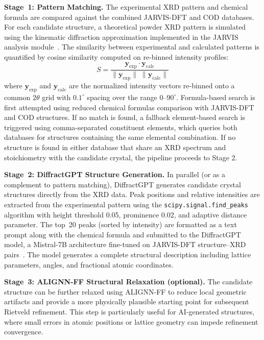 \documentclass[pdflatex,sn-mathphys-num]{sn-jnl}
\theoremstyle{thmstyleone}
\theoremstyle{thmstyletwo}
\theoremstyle{thmstylethree}
\begin{document}
\textbf{Stage~1: Pattern Matching.}
The experimental XRD pattern and chemical formula are compared against the combined JARVIS-DFT and COD databases. For each candidate structure, a theoretical powder XRD pattern is simulated using the kinematic diffraction approximation implemented in the JARVIS analysis module~\cite{jarvis2020}. The similarity between experimental and calculated patterns is quantified by cosine similarity computed on re-binned intensity profiles:
\begin{equation}
S = \frac{\mathbf{y}_{\mathrm{exp}} \cdot \mathbf{y}_{\mathrm{calc}}}
         {\|\mathbf{y}_{\mathrm{exp}}\| \; \|\mathbf{y}_{\mathrm{calc}}\|}
\label{eq:cosine}
\end{equation}
where $\mathbf{y}_{\mathrm{exp}}$ and $\mathbf{y}_{\mathrm{calc}}$ are the normalized intensity vectors re-binned onto a common $2\theta$ grid with $0.1^\circ$ spacing over the range $0$--$90^\circ$. Formula-based search is first attempted using reduced chemical formulas comparison with JARVIS-DFT and COD structures. If no match is found, a fallback element-based search is triggered using comma-separated constituent elements, which queries both databases for structures containing the same elemental combination. If no structure is found in either database that share an XRD spectrum and stoichiometry with the candidate crystal, the pipeline proceeds to Stage 2.

\textbf{Stage~2: DiffractGPT Structure Generation.}
In parallel (or as a complement to pattern matching), DiffractGPT generates candidate crystal structures directly from the XRD data. Peak positions and relative intensities are extracted from the experimental pattern using the \texttt{scipy.signal.find\_peaks} algorithm with height threshold 0.05, prominence 0.02, and adaptive distance parameter. The top~20 peaks (sorted by intensity) are formatted as a text prompt along with the chemical formula and submitted to the DiffractGPT model, a Mistral-7B architecture fine-tuned on JARVIS-DFT structure--XRD pairs~\cite{diffractgpt2025}. The model generates a complete structural description including lattice parameters, angles, and fractional atomic coordinates.

\textbf{Stage~3: ALIGNN-FF Structural Relaxation (optional).}
The candidate structure can be further relaxed using ALIGNN-FF to reduce local geometric artifacts and provide a more physically plausible starting point for subsequent Rietveld refinement. This step is particularly useful for AI-generated structures, where small errors in atomic positions or lattice geometry can impede refinement convergence.
\end{document}
